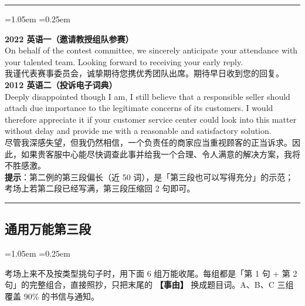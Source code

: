 \documentclass[11pt,a4paper]{ctexart}
\newcommand{\fillin}[1]{{\bfseries【#1】}}
\newenvironment{tpl}[1]{%
  \par\addvspace{7pt}\needspace{4\baselineskip}%
  \noindent{\bfseries\color{accent}#1}\par\nopagebreak
  \vspace{2pt}\noindent\rule{\linewidth}{0.7pt}\par\nopagebreak\vspace{3pt}%
  \begin{list}{}{\leftmargin=1.05em \rightmargin=0.25em \listparindent=0pt
    \itemindent=0pt \topsep=0pt \parsep=2.5pt \itemsep=2.5pt \partopsep=0pt}%
  \item\relax
}{%
  \end{list}\vspace{1pt}\noindent\rule{\linewidth}{0.7pt}\par\addvspace{8pt}%
}
\newenvironment{note}{%
  \par\addvspace{5pt}%
  \begin{list}{}{\leftmargin=1.05em \rightmargin=0.25em \listparindent=0pt
    \itemindent=0pt \topsep=0pt \parsep=2pt \itemsep=2pt \partopsep=0pt}%
  \item\relax\small\color{ink}%
}{%
  \end{list}\addvspace{5pt}%
}
\begin{document}
\begin{tpl}{真题范文第三段两例}
\textbf{2022 英语一（邀请教授组队参赛）}\\
On behalf of the contest committee, we sincerely anticipate your attendance with your talented team. Looking forward to receiving your early reply.\\[2pt]
我谨代表赛事委员会，诚挚期待您携优秀团队出席。期待早日收到您的回复。\\[4pt]
\textbf{2012 英语二（投诉电子词典）}\\
Deeply disappointed though I am, I still believe that a responsible seller should attach due importance to the legitimate concerns of its customers. I would therefore appreciate it if your customer service center could look into this matter without delay and provide me with a reasonable and satisfactory solution.\\[2pt]
尽管我深感失望，但我仍然相信，一个负责任的商家应当重视顾客的正当诉求。因此，如果贵客服中心能尽快调查此事并给我一个合理、令人满意的解决方案，我将不胜感激。\\[3pt]
\textbf{提示}：第二例的第三段偏长（近 50 词），是「第三段也可以写得充分」的示范；考场上若第二段已经写满，第三段压缩回 2 句即可。
\end{tpl}


\subsection{通用万能第三段}

\begin{note}
考场上来不及按类型挑句子时，用下面 6 组万能收尾。每组都是「第 1 句 + 第 2 句」的完整组合，直接照抄，只把末尾的 \fillin{事由} 换成题目词。A、B、C 三组覆盖 90\% 的书信与通知。
\end{note}
\end{document}
